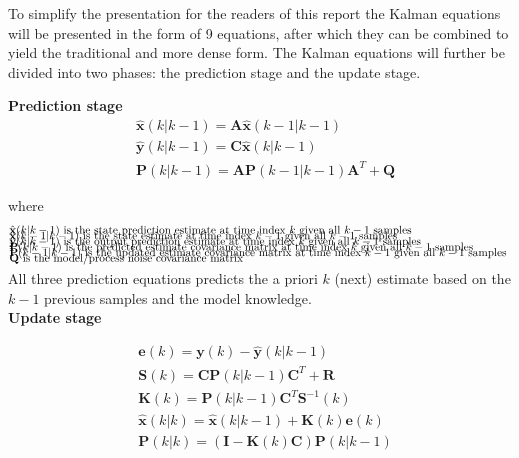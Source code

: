 To simplify the presentation for the readers of this report the Kalman equations will be presented in the form of 9 equations, after which they can be combined to yield the traditional and more dense form.
The Kalman equations will further be divided into two phases: the prediction stage and the update stage. 

\textbf{Prediction stage}
\begin{align}
	&\hat{\textbf{x}}	(k|k-1) = \textbf{A} 	\hat{\textbf{x}}(k-1|k-1)  				\label{eq:Kalman_pred_state} 	\\
	&\hat{\textbf{y}}	(k|k-1) = \textbf{C}	\hat{\textbf{x}}(k|k-1)										\label{eq:Kalman_pred_output} 	\\
	&\textbf{P}			(k|k-1) = \textbf{A}	\textbf{P}(k-1|k-1)\textbf{A}^T+\textbf{Q} 								\label{eq:Kalman_pred_cov} 		
\end{align}

where 
\begin{align*}
	&\text{$\hat{\textbf{x}}	(k|k-1)$ 	is the state prediction 			estimate at time index $k$ 		given all $ k-1 $ samples		}	\\[-1em]
	&\text{$\hat{\textbf{x}}	(k-1|k-1)$ 	is the state 						estimate at time index $k-1$ 	given all $ k-1 $ samples		}	\\[-1em]
	&\text{$\hat{\textbf{y}}	(k|k-1)$ 	is the output prediction 			estimate at time index $k$ 		given all $ k-1 $ samples		}	\\[-1em]
	&\text{$\textbf{P}			(k|k-1)$ 	is the predicted estimate  covariance matrix at time index $k$ 		given all $ k-1 $ samples		}	\\[-1em]
	&\text{$\textbf{P}			(k-1|k-1)$ 	is the updated estimate    covariance matrix at time index $k-1$ 	given all $ k-1 $ samples		}	\\[-1em]
	&\text{$\textbf{Q}$						is the model/process noise covariance matrix														}	\\[-1em]
\end{align*}

All three prediction equations predicts the a priori $k$ (next) estimate based on the $k-1$ previous samples and the model knowledge.\\
\textbf{Update stage}

\begin{align}
	&\textbf{e}			(k) 		= \textbf{y}(k) - \hat{\textbf{y}}(k|k-1)							\label{eq:Kalman_upd_inno}			\\
	&\textbf{S}			(k) 		= \textbf{C}\textbf{P}(k|k-1)\textbf{C}^T + \textbf{R}				\label{eq:Kalman_upd_inno_cov}		\\
	&\textbf{K}			(k) 		= \textbf{P}(k|k-1)\textbf{C}^T\textbf{S}^{-1}(k)					\label{eq:Kalman_upd_kalman_gain}	\\
	&\hat{\textbf{x}}	(k|k) 		= \hat{\textbf{x}}(k|k-1) + \textbf{K}(k)\textbf{e}(k) 				\label{eq:Kalman_upd_est_state}		\\
	&\textbf{P}			(k|k) 		= (\textbf{I} - \textbf{K}(k)\textbf{C})\textbf{P}(k|k-1)			\label{eq:Kalman_upd_est_cov}
\end{align}

